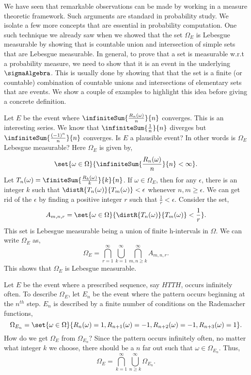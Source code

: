 We have seen that remarkable observations can be made by working in a measure theoretic framework.
Such arguments are standard in probability study. We isolate a few more concepts that are essential
in probability computation. One such technique we already saw when we showed that the set $\Omega_{E}$
is Lebesgue measurable by showing that is countable union and intersection of simple sets that are
Lebesgue measurable. In general, to prove that a set is measurable w.r.t a probability measure, we need
to show that it is an event in the underlying $\sigmaAlgebra$. This is usually done by showing that
that the set is a finite (or countable) combination of countable unions and intersections of elementary
sets that are events. We show a couple of examples to highlight this idea before giving a concrete 
definition.
\begin{Example}
    Let $E$ be the event where $\infiniteSum{\frac{R_n(\omega)}{n}}{n}$ converges. This is an interesting series.
    We know that $\infiniteSum{\frac{1}{n}}{n}$ diverges but $\infiniteSum{\frac{{(-1)}^{n}}{n}}{n}$
    converges. Is $E$ a plausible event? In other words is $\Omega_{E}$ Lebesgue measurable?
    Here $\Omega_{E}$ is given by,
    \[\set{\omega\in\Omega}{\infiniteSum{\frac{R_n(\omega)}{n}}{n} < \infty}.\]
    Let $T_n(\omega) = \finiteSum{\frac{R_k(\omega)}{k}}{k}{n}$. If $\omega\in\Omega_{E}$, then
    for any $\epsilon$, there is an integer $k$ such that
    $\distR{T_n(\omega)}{T_m(\omega)} < \epsilon$ whenever $n,m \geq \epsilon$. We can get rid of
    the $\epsilon$ by finding a positive integer $r$ such that $\frac{1}{r} < \epsilon$.
    Consider the set,
    \[A_{m,n,r} = \set{\omega\in\Omega}{\distR{T_n(\omega)}{T_m(\omega)} < \frac{1}{r}}.\]
    This set is Lebesgue measurable being a union of finite h-intervals in $\Omega$. We can write
    $\Omega_{E}$ as,
    \[\Omega_{E} =
	\bigcap\limits_{r=1}^{\infty}\bigcup\limits_{k=1}^{\infty}\bigcap\limits_{m,n \geq
	    k}^{\infty}A_{m,n,r}.\]
    This shows that $\Omega_{E}$ is Lebesgue measurable.
\end{Example}
\begin{Example}
    Let $E$ be the event where a prescribed sequence, say $HTTH$, occurs infinitely often. To
    describe $\Omega_{E}$, let $E_n$ be the event where the pattern occurs beginning at the
    $n^{th}$ step. $E_n$ is described by a finite number of conditions on the Rademacher functions,
    \[\Omega_{E_n} = \set{\omega\in\Omega}{R_n(\omega) =
	    1,R_{n+1}(\omega)=-1,R_{n+2}(\omega)=-1,R_{n+3}(\omega)=1}.\]
    How do we get $\Omega_{E}$ from $\Omega_{E_n}$? Since the pattern occurs infinitely
    often, no matter what integer $k$ we choose, there should be a $n$ far out such that
    $\omega\in \Omega_{E_n}$. Thus,
    \[\Omega_{E} = \bigcap\limits_{k=1}^{\infty}\bigcup\limits_{n\geq k}^{\infty}
	\Omega_{E_n}.\]
\end{Example}
